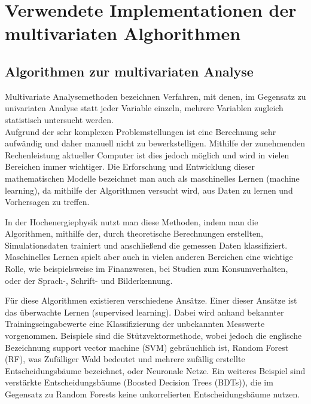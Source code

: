 \chapter{Verwendete Implementationen der multivariaten Alghorithmen}
\label{ch:algorithmen}

{}	%


\section{Algorithmen zur multivariaten Analyse}
\label{ch:Theorie:sec:Algorithmen}

Multivariate Analysemethoden bezeichnen Verfahren, mit denen, im Gegensatz zu univariaten Analyse statt jeder Variable einzeln, mehrere Variablen zugleich statistisch untersucht werden.\\
Aufgrund der sehr komplexen Problemstellungen ist eine Berechnung sehr aufw\"andig und daher manuell nicht zu bewerkstelligen. Mithilfe der zunehmenden Rechenleistung aktueller Computer ist dies jedoch m\"oglich und wird in vielen Bereichen immer wichtiger. Die Erforschung und Entwicklung dieser mathematischen Modelle bezeichnet man auch als maschinelles Lernen (machine learning), da mithilfe der Algorithmen versucht wird, aus Daten zu lernen und Vorhersagen zu treffen. \cite{SWB-455193959}

In der Hochenergiephysik nutzt man diese Methoden, indem man die Algorithmen, mithilfe der, durch theoretische Berechnungen erstellten, Simulationsdaten trainiert und anschlie\ss end die gemessen Daten klassifiziert.\\ 
Maschinelles Lernen spielt aber auch in vielen anderen Bereichen eine wichtige Rolle, wie beispielsweise im Finanzwesen, bei Studien zum Konsumverhalten, oder der Sprach-, Schrift- und Bilderkennung.

F\"ur diese Algorithmen existieren verschiedene Ans\"atze. Einer dieser Ans\"atze ist das \"uberwachte Lernen (supervised learning). Dabei wird anhand bekannter Trainingseingabewerte eine Klassifizierung der unbekannten Messwerte vorgenommen. Beispiele sind die St\"utzvektormethode, wobei jedoch die englische Bezeichnung support vector machine (SVM) gebr\"auchlich ist, Random Forest (RF), was Zuf\"alliger Wald bedeutet und mehrere zuf\"allig erstellte Entscheidungsb\"aume bezeichnet, oder Neuronale Netze. Ein weiteres Beispiel sind verst\"arkte Entscheidungsb\"aume (Boosted Decision Trees (BDTs)), die im Gegensatz zu Random Forests keine unkorrelierten Entscheidungsb\"aume nutzen.


